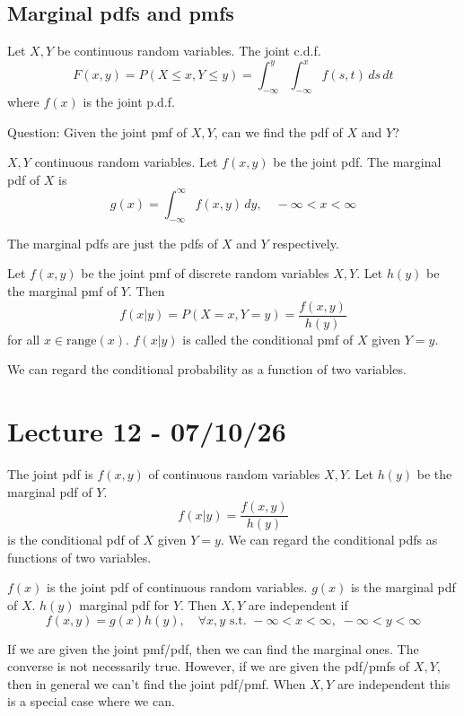 \documentclass[11pt]{article}
\begin{document}
\subsection{Marginal pdfs and pmfs}
\begin{definition}
    Let $X,Y$ be continuous random variables. The joint c.d.f. 
    \[
        F(x,y) = P(X \le x, Y \le y) = \int_{-\infty}^{y}\int_{-\infty}^{x} f(s,t)\, ds \, dt
    \]
    where $f(x)$ is the joint p.d.f.
    
\end{definition}
Question: Given the joint pmf of $X, Y$, can we find the pdf of $X$ and $Y$?
\begin{definition}
    $X, Y$ continuous random variables. Let $f(x,y)$ be the joint pdf. The marginal pdf of $X$ is
    \[
        g(x) = \int_{-\infty}^{\infty} f(x,y)\, dy, \quad -\infty < x < \infty
    \]
\end{definition}
\begin{remark}
    The marginal pdfs are just the pdfs of $X$ and $Y$ respectively.
\end{remark}

\begin{definition}
    Let $f(x,y)$ be the joint pmf of discrete random variables $X,Y$. Let $h(y)$ be the marginal pmf of $Y$.
    Then 
    \[
        f(x|y) = P(X=x,Y=y) = \frac{f(x,y)}{h(y)}
    \]
    for all $x \in \text{range}(x)$. $f(x|y)$ is called the conditional pmf of $X$ given $Y=y$. 
\end{definition}
\begin{remark}
    We can regard the conditional probability as a function of two variables.
\end{remark}

\section{Lecture 12 - 07/10/26}
\begin{definition}
    The joint pdf is $f(x,y)$ of continuous random variables $X,Y$. Let $h(y)$ be the marginal pdf of $Y$.
    \[
        f(x|y) = \frac{f(x,y)}{h(y)}
    \]
    is the conditional pdf of $X$ given $Y=y$. We can regard the conditional pdfs as functions of two variables.
\end{definition}
\begin{definition}
    $f(x)$ is the joint pdf of continuous random variables. $g(x)$ is the marginal pdf of $X$. $h(y)$ marginal pdf for $Y$. Then $X,Y$ are independent if 
    \[
        f(x,y) = g(x)h(y), \quad \forall x,y \text{ s.t. }  -\infty < x < \infty, \; -\infty< y < \infty
    \]
    
\end{definition}
\begin{remark}
    If we are given the joint pmf/pdf, then we can find the marginal ones. The converse is not necessarily true. 
    However, if we are given the pdf/pmfs of $X,Y$, then in general we can't find the joint pdf/pmf. When $X,Y$ are independent this is a special case where we can.
\end{remark}
\end{document}
